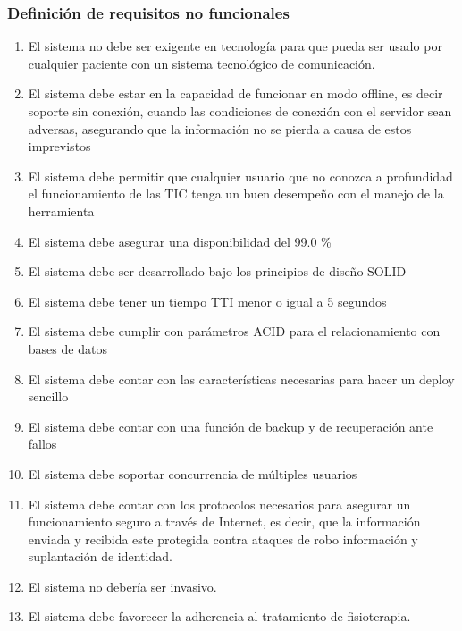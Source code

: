 \documentclass[12pt]{article}
\begin{document}
\subsubsection{Definición de requisitos no funcionales}

\begin{enumerate}[start=1,label={\bfseries RNF\arabic*.}]


\item  El sistema no debe ser exigente en tecnología para que pueda ser usado por cualquier paciente con un sistema tecnológico de comunicación. %

\item El sistema debe estar en la capacidad de funcionar en modo offline, es decir soporte sin conexión, cuando las condiciones de conexión con el servidor sean adversas, asegurando que la información no se pierda a causa de estos imprevistos

\item El sistema debe permitir que cualquier usuario que no conozca a profundidad el funcionamiento de las TIC tenga un buen desempeño con el manejo de la herramienta

\item El sistema debe asegurar una disponibilidad del 99.0 \%

\item El sistema debe ser desarrollado bajo los principios de diseño SOLID

\item El sistema debe tener un tiempo TTI menor o igual a 5 segundos

 \item El sistema debe cumplir con parámetros ACID para el relacionamiento con bases de datos
 
\item El sistema debe contar con las características necesarias para hacer un deploy sencillo

\item El sistema debe contar con una función de backup y de recuperación ante fallos
\item El sistema debe soportar concurrencia de múltiples usuarios
\item El sistema debe contar con los protocolos necesarios para asegurar un funcionamiento seguro a través de Internet, es decir, que la información enviada y recibida este protegida contra ataques de robo información y suplantación de identidad. 
\item El sistema no debería ser invasivo.
        
\item El sistema debe favorecer la adherencia al tratamiento de fisioterapia.

\end{enumerate}
\end{document}
